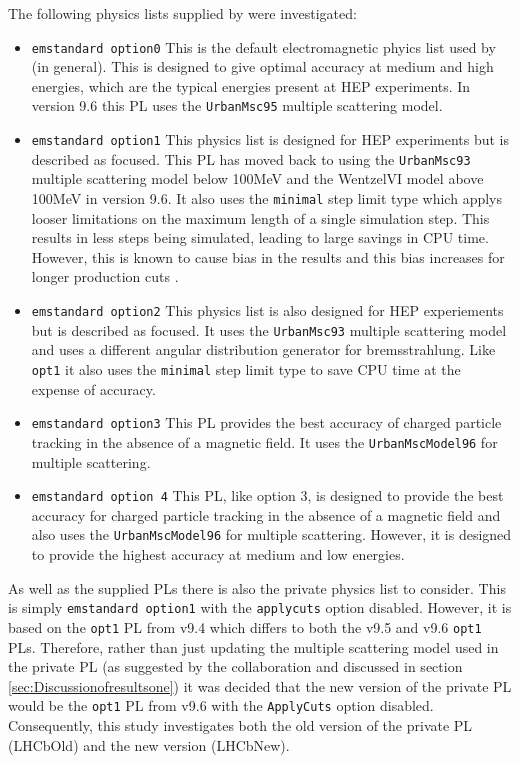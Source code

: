 The following physics lists supplied by \geant were investigated:
\begin{itemize}
\item \texttt{emstandard option0}
  This is the default electromagnetic phyics list used by \geant (in general).  This is designed to give optimal accuracy at medium and high energies, which are the typical energies present at HEP experiments.  In version 9.6 this PL uses the \texttt{UrbanMsc95} multiple scattering model.
\item \texttt{emstandard option1}
  This physics list is designed for HEP experiments but is described as \cms focused. This PL has moved back to using the \texttt{UrbanMsc93} multiple scattering model below 100MeV and the WentzelVI model above 100MeV in version 9.6.  It also uses the \texttt{minimal} step limit type which applys looser limitations on the maximum length of a single simulation step.  This results in less steps being simulated, leading to large savings in CPU time.  However, this is known to cause bias in the results and this bias increases for longer production cuts \cite{1742-6596-219-3-032045}.
\item \texttt{emstandard option2}
  This physics list is also designed for HEP experiements but is described as \lhcb focused.  It uses the \texttt{UrbanMsc93} multiple scattering model and uses a different angular distribution generator for bremsstrahlung.  Like \texttt{opt1} it also uses the \texttt{minimal} step limit type to save CPU time at the expense of accuracy.
\item \texttt{emstandard option3}
  This PL provides the best accuracy of charged particle tracking in the absence of a magnetic field.  It uses the \texttt{UrbanMscModel96} for multiple scattering.
\item \texttt{emstandard option 4}
  This PL, like option 3, is designed to provide the best accuracy for charged particle tracking in the absence of a magnetic field and also uses the \texttt{UrbanMscModel96} for multiple scattering.  However, it is designed to provide the highest accuracy at medium and low energies.
\end{itemize}

As well as the \geant supplied PLs there is also the \lhcb private physics list to consider.  This is simply \texttt{emstandard option1} with the \texttt{applycuts} option disabled.  However, it is based on the \texttt{opt1} PL from \geant v9.4 which differs to both the v9.5 and v9.6 \texttt{opt1} PLs.  Therefore, rather than just updating the multiple scattering model used in the \lhcb private PL (as suggested by the \geant collaboration  and discussed in section \ref{sec:Discussionofresultsone}) it was decided that the new version of the \lhcb private PL would be the \texttt{opt1} PL from v9.6 with the \texttt{ApplyCuts} option disabled. Consequently, this study investigates both the old version of the \lhcb private PL (LHCbOld) and the new version (LHCbNew).

